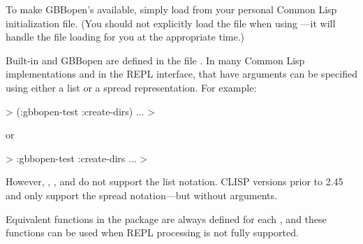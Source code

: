 \documentclass[10pt,twoside,english,pdftex]{article}
\begin{document}
To make GBBopen's  available, simply load
 from your personal
Common Lisp initialization file.  (You should not explicitly load the
 file when using
---it will handle the
 file loading for you at
the appropriate time.)

Built-in and GBBopen  are defined in the file
.  In many Common Lisp
implementations and in the
 REPL interface,
 that have arguments can be specified using either a list
or a spread representation.  For example:
%
\W\supp
\begin{example}
  > (:gbbopen-test :create-dirs)
       ...
  >
\end{example}
%
or
%
\W\supp\notpretop
\begin{example}
  > :gbbopen-test :create-dirs
       ...
  >
\end{example}
%
However, ,
, and
 do not support the list
notation.  CLISP versions prior to 2.45 and
 only support the spread
notation---but without arguments.

Equivalent functions in the  package are always
defined for each , and these functions can be used when
REPL  processing is not fully supported.
\end{document}
